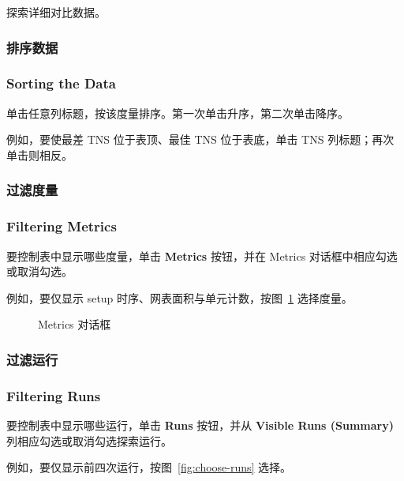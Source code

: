 \begin{seeAlsoBox}
探索详细对比数据。
\end{seeAlsoBox}

\subsubsection{排序数据}
\subsubsection*{Sorting the Data}

单击任意列标题，按该度量排序。第一次单击升序，第二次单击降序。

例如，要使最差 TNS 位于表顶、最佳 TNS 位于表底，单击 TNS 列标题；再次单击则相反。

\subsubsection{过滤度量}
\subsubsection*{Filtering Metrics}

要控制表中显示哪些度量，单击 \textbf{Metrics} 按钮，并在 Metrics 对话框中相应勾选或取消勾选。

例如，要仅显示 setup 时序、网表面积与单元计数，按图~\ref{fig:metrics-dialog} 选择度量。

\begin{figure}[htbp]
\centering
{}
\caption{Metrics 对话框}
\label{fig:metrics-dialog}
\end{figure}

\subsubsection{过滤运行}
\subsubsection*{Filtering Runs}

要控制表中显示哪些运行，单击 \textbf{Runs} 按钮，并从 \textbf{Visible Runs (Summary)} 列相应勾选或取消勾选探索运行。

例如，要仅显示前四次运行，按图~\ref{fig:choose-runs} 选择。


